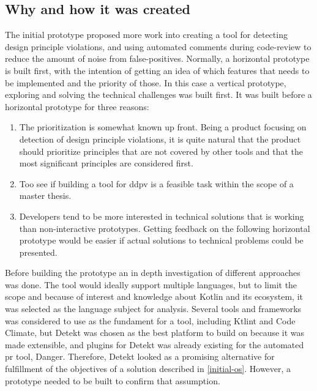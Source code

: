 \documentclass[pdftex,10pt,b5paper,twoside]{report}
\begin{document}
\subsection*{Why and how it was created}
The initial prototype proposed more work into creating a tool for detecting design principle violations, and using automated comments during code-review to reduce the amount of noise from false-positives. Normally, a horizontal prototype is built first, with the intention of getting an idea of which features that needs to be implemented and the priority of those. In this case a vertical prototype, exploring and solving the technical challenges was built first. It was built before a horizontal prototype for three reasons:

\begin{enumerate}
    \item The prioritization is somewhat known up front. Being a product focusing on detection of design principle violations, it is quite natural that the product should prioritize principles that are not covered by other tools and that the most significant principles are considered first.
    \item Too see if building a tool for \gls{ddpv} is a feasible task within the scope of a master thesis.
    \item Developers tend to be more interested in technical solutions that is working than non-interactive prototypes. Getting feedback on the following horizontal prototype would be easier if actual solutions to technical problems could be presented.
\end{enumerate}

Before building the prototype an in depth investigation of different approaches was done. The tool would ideally support multiple languages, but to limit the scope and because of interest and knowledge about Kotlin and its ecosystem, it was selected as the language subject for analysis. Several tools and frameworks was considered to use as the fundament for a tool, including Ktlint\cite{ktlint} and Code Climate\cite{codeclimate}, but Detekt\cite{detekt} was chosen as the best platform to build on because it was made extensible, and plugins for Detekt was already existing for the automated \gls{pr} tool\cite{danger-detekt-plugin}, Danger\cite{danger}. Therefore, Detekt looked as a promising alternative for fulfillment of the objectives of a solution described in \ref{initial-os}. However, a prototype needed to be built to confirm that assumption. 
\end{document}
